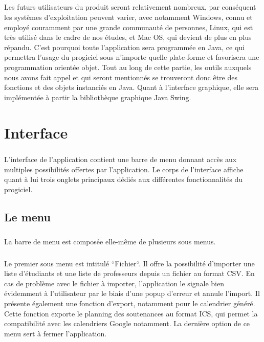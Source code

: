 \documentclass[a4paper,10pt]{report}
\begin{document}
	\paragraph{}
	  Les futurs utilisateurs du produit seront relativement nombreux, par conséquent les systèmes d'exploitation peuvent varier, avec notamment Windows, connu et employé couramment par une grande communauté de personnes, Linux, qui est très utilisé dans le cadre de nos études, et Mac OS, qui devient de plus en plus répandu.
	  C'est pourquoi toute l'application sera programmée en Java, ce qui permettra l'usage du progiciel sous n'importe quelle plate-forme et favorisera une programmation orientée objet.
	  Tout au long de cette partie, les outils auxquels nous avons fait appel et qui seront mentionnés se trouveront donc être des fonctions et des objets instanciés en Java.
	  Quant à l'interface graphique, elle sera implémentée à partir la bibliothèque graphique Java Swing.
  
  
  \chapter{Interface}
	\paragraph{}
	  L'interface de l'application contient une barre de menu donnant accès aux multiples possibilités offertes par l'application.
	  Le corps de l'interface affiche quant à lui trois onglets principaux dédiés aux différentes fonctionnalités du progiciel. 
	  
	\section{Le menu}
	
	
	  \paragraph{}
	    La barre de menu est composée elle-même de plusieurs sous menus.
	  \paragraph{}
	    Le premier sous menu est intitulé ``Fichier``. Il offre la possibilité d'importer une liste d'étudiants et une liste de professeurs depuis un fichier au format CSV.
	    En cas de problème avec le fichier à importer, l'application le signale bien évidemment à l'utilisateur par le biais d'une popup d'erreur et annule l'import.
	    Il présente également une fonction d'export, notamment pour le calendrier généré. Cette fonction exporte le planning des soutenances au format ICS, qui permet la compatibilité avec les calendriers Google notamment.
	    La dernière option de ce menu sert à fermer l'application.
\end{document}
